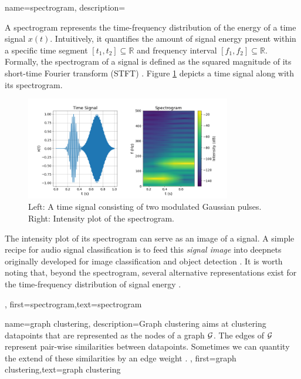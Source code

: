 {name={spectrogram},
	description={
		A spectrogram represents the time-frequency distribution of the energy of a time signal $x(t)$.  
		Intuitively, it quantifies the amount of signal energy present within a specific time segment 
		$[t_{1},t_{2}] \subseteq \mathbb{R}$ and frequency interval $[f_{1},f_{2}]\subseteq \mathbb{R}$. 
		Formally, the spectrogram of a signal is defined as the squared magnitude of its 
		short-time Fourier transform (STFT) \cite{cohen1995time}.
        Figure \ref{fig:spectrogram} depicts a time signal along with its spectrogram. 
	\begin{figure}
		\centering
		\includegraphics[width=0.8\textwidth]{assets/spectrogram.png}
		\caption{Left: A time signal consisting of two modulated Gaussian pulses. Right: Intensity 
		plot of the spectrogram.
		\label{fig:spectrogram}}
	\end{figure}
        The intensity plot of its spectrogram can serve as an image of a signal. A 
		simple recipe for audio signal classification is to feed this \emph{signal image} 
		into \gls{deepnet}s originally developed for image classification and object detection \cite{Li:2022aa}. 
		It is worth noting that, beyond the spectrogram, several alternative representations exist 
		for the time-frequency distribution of signal energy \cite{TimeFrequencyAnalysisBoashash,MallatBook}. 
		}, 
	first={spectrogram},text={spectrogram} 
}

{name={graph clustering},
	description={Graph clustering aims at 
		clustering \gls{datapoint}s that are represented as the nodes 
		of a \gls{graph} $\mathcal{G}$. The edges of $\mathcal{G}$ represent 
		pair-wise similarities between \gls{datapoint}s. Sometimes we
		can quantity the extend of these similarities by an edge weight \cite{Luxburg2007,FlowSpecClustering2021}. }, 
	first={graph clustering},text={graph clustering} 
}

